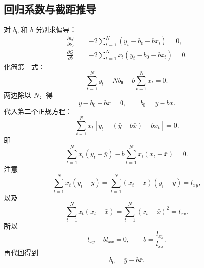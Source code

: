 \documentclass[UTF8,12pt,a4paper]{ctexart}
\begin{document}
\subsection{回归系数与截距推导}
对 $b_0$ 和 $b$ 分别求偏导：
\begin{equation*}
\begin{aligned}
    \frac{\partial Q}{\partial b_0}
    &=-2\sum_{t=1}^{N}(y_t-b_0-bx_t)=0,\\
    \frac{\partial Q}{\partial b}
    &=-2\sum_{t=1}^{N}x_t(y_t-b_0-bx_t)=0 .
\end{aligned}
\end{equation*}
化简第一式：
\begin{equation*}
    \sum_{t=1}^{N}y_t-Nb_0-b\sum_{t=1}^{N}x_t=0 .
\end{equation*}
两边除以 $N$，得
\begin{equation*}
    \bar{y}-b_0-b\bar{x}=0,
    \qquad
    b_0=\bar{y}-b\bar{x} .
\end{equation*}
代入第二个正规方程：
\begin{equation*}
    \sum_{t=1}^{N}x_t\left[y_t-(\bar{y}-b\bar{x})-bx_t\right]=0 .
\end{equation*}
即
\begin{equation*}
    \sum_{t=1}^{N}x_t(y_t-\bar{y})-b\sum_{t=1}^{N}x_t(x_t-\bar{x})=0 .
\end{equation*}
注意
\begin{equation*}
    \sum_{t=1}^{N}x_t(y_t-\bar{y})
    =\sum_{t=1}^{N}(x_t-\bar{x})(y_t-\bar{y})=l_{xy},
\end{equation*}
以及
\begin{equation*}
    \sum_{t=1}^{N}x_t(x_t-\bar{x})
    =\sum_{t=1}^{N}(x_t-\bar{x})^2=l_{xx} .
\end{equation*}
所以
\begin{equation*}
    l_{xy}-b l_{xx}=0,
    \qquad
    b=\frac{l_{xy}}{l_{xx}} .
\end{equation*}
再代回得到
\begin{equation*}
    b_0=\bar{y}-b\bar{x} .
\end{equation*}

\newpage
\end{document}

